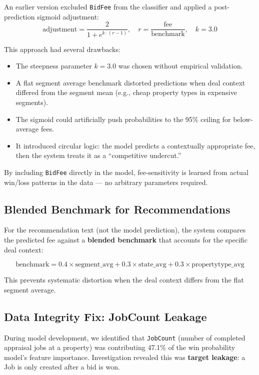 \documentclass[12pt,a4paper]{article}
\begin{document}
An earlier version excluded \texttt{BidFee} from the classifier and applied a post-prediction sigmoid adjustment:
\begin{equation}
\text{adjustment} = \frac{2}{1 + e^{k \cdot (r - 1)}}, \quad r = \frac{\text{fee}}{\text{benchmark}}, \quad k = 3.0
\end{equation}

This approach had several drawbacks:
\begin{itemize}[nosep]
    \item The steepness parameter $k = 3.0$ was chosen without empirical validation.
    \item A flat segment average benchmark distorted predictions when deal context differed from the segment mean (e.g., cheap property types in expensive segments).
    \item The sigmoid could artificially push probabilities to the 95\% ceiling for below-average fees.
    \item It introduced circular logic: the model predicts a contextually appropriate fee, then the system treats it as a ``competitive undercut.''
\end{itemize}

By including \texttt{BidFee} directly in the model, fee-sensitivity is learned from actual win/loss patterns in the data --- no arbitrary parameters required.

\subsection{Blended Benchmark for Recommendations}

For the recommendation text (not the model prediction), the system compares the predicted fee against a \textbf{blended benchmark} that accounts for the specific deal context:

\begin{equation}
\text{benchmark} = 0.4 \times \text{segment\_avg} + 0.3 \times \text{state\_avg} + 0.3 \times \text{propertytype\_avg}
\end{equation}

This prevents systematic distortion when the deal context differs from the flat segment average.

\subsection{Data Integrity Fix: JobCount Leakage}
\label{sec:data-integrity}

During model development, we identified that \texttt{JobCount} (number of completed appraisal jobs at a property) was contributing 47.1\% of the win probability model's feature importance. Investigation revealed this was \textbf{target leakage}: a Job is only created after a bid is won.
\end{document}
